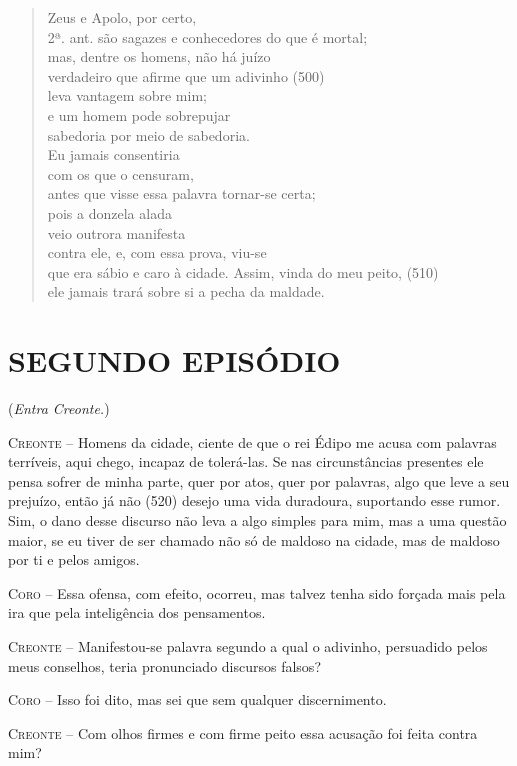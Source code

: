 \begin{verse}
Zeus e Apolo, por certo,\\ 2ª. ant.
são sagazes e conhecedores do que é mortal;\\
mas, dentre os homens, não há juízo\\
verdadeiro que afirme que um adivinho (500)\\
leva vantagem sobre mim;\\
e um homem pode sobrepujar\\
sabedoria por meio de sabedoria.\\
Eu jamais consentiria\\
com os que o censuram,\\
antes que visse essa palavra tornar-se certa;\\
pois a donzela alada\\
veio outrora manifesta\\
contra ele, e, com essa prova, viu-se\\
que era sábio e caro à cidade. Assim, vinda do meu peito, (510)\\
ele jamais trará sobre si a pecha da maldade.
\end{verse}

\section{SEGUNDO EPISÓDIO}

(\emph{Entra Creonte.})

\textsc{Creonte} --   Homens da cidade, ciente de que o rei Édipo me acusa com palavras
terríveis, aqui chego, incapaz de tolerá-las. Se nas circunstâncias
presentes ele pensa sofrer de minha parte, quer por atos, quer por
palavras, algo que leve a seu prejuízo, então já não (520) desejo uma
vida duradoura, suportando esse rumor. Sim, o dano desse discurso não
leva a algo simples para mim, mas a uma questão maior, se eu tiver de
ser chamado não só de maldoso na cidade, mas de maldoso por ti e pelos
amigos.

\textsc{Coro} --   Essa ofensa, com efeito, ocorreu, mas talvez tenha sido forçada mais
pela ira que pela inteligência dos pensamentos.

\textsc{Creonte} --   Manifestou-se palavra segundo a qual o adivinho, persuadido pelos meus
conselhos, teria pronunciado discursos falsos?

\textsc{Coro} --   Isso foi dito, mas sei que sem qualquer discernimento.

\textsc{Creonte} --   Com olhos firmes e com firme peito essa acusação foi feita contra mim?

